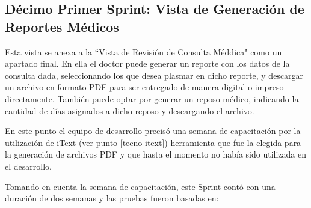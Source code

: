     \subsection{Décimo Primer Sprint: Vista de Generación de Reportes Médicos}
    Esta vista se anexa a la ``Vista de Revisión de Consulta Méddica" como un apartado final. En ella el doctor puede generar un reporte con los datos de la consulta dada, seleccionando los que desea plasmar en dicho reporte, y descargar un archivo en formato PDF para ser entregado de manera digital o impreso directamente. También puede optar por generar un reposo médico, indicando la cantidad de días asignados a dicho reposo y descargando el archivo.
    
    En este punto el equipo de desarrollo precisó una semana de capacitación por la utilización de iText (ver punto \ref{tecno-itext}) herramienta que fue la elegida para la generación de archivos PDF y que hasta el momento no había sido utilizada en el desarrollo.
    
    Tomando en cuenta la semana de capacitación, este Sprint contó con una duración de dos semanas y las pruebas fueron basadas en:
    
